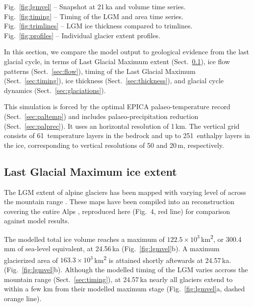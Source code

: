 \documentclass[tc, manuscript]{copernicus}
\begin{document}
    Fig.~\ref{fig:lgmvel} -- Snapshot at 21\,ka and volume time series.\\
    Fig.~\ref{fig:timing} -- Timing of the LGM and area time series.\\
    Fig.~\ref{fig:trimlines} -- LGM ice thickness compared to trimlines.\\
    Fig.~\ref{fig:profiles} -- Individual glacier extent profiles.

    In this section, we compare the model output to geological evidence from
    the last glacial cycle, in terms of Last Glacial Maximum extent
    (Sect.~\ref{sec:extent}), ice flow patterns
    (Sect.~\ref{sec:flow}), timing of the Last Glacial Maximum
    (Sect.~\ref{sec:timing}), ice thickness (Sect.~\ref{sec:thickness}), and
    glacial cycle dynamics (Sect.~\ref{sec:glaciations}).

    This simulation is forced by the optimal EPICA palaeo-temperature record
    (Sect.~\ref{sec:paltemp}) and includes palaeo-precipitation reduction
    (Sect.~\ref{sec:palprec}). It uses an horizontal resolution of 1\,km. The
    vertical grid consists of 61~temperature layers in the bedrock and up to
    251~enthalpy layers in the ice, corresponding to vertical resolutions of 50
    and 20\,\unit{m}, respectively.


\subsection{Last Glacial Maximum ice extent}
\label{sec:extent}

    The LGM extent of alpine glaciers has been mapped with varying level of
    across the mountain range \citep{Penck.Bruckner.1909, Jackli.1962,
    Bini.etal.2009, Coutterand.2010, Bavec.Verbic.2011,
    Buoncristiani.Campy.2011, Husen.2011}. These maps have been compiled
    into an reconstruction covering the entire Alps \citep{Ehlers.etal.2011},
    reproduced here (Fig.~4, red line) for comparison against model results.

    The modelled total ice volume reaches a maximum of $122.5 \times 10^{3}$\,\unit{km^2},
    or 300.4\,mm of sea-level equivalent, at 24.56\,ka
    (Fig.~\ref{fig:lgmvel}b). A maximum glacierized area of
    $163.3 \times 10^{3}$\,\unit{km^2} is attained shortly aftewards at 24.57\,ka.
    (Fig.~\ref{fig:lgmvel}b). Although the modelled timing of the LGM varies
    accross the mountain range (Sect.~\ref{sec:timing}), at 24.57\,ka nearly
    all glaciers extend to within a few km from their modelled maximum stage
    (Fig.~\ref{fig:lgmvel}a, dashed orange line).
\end{document}
